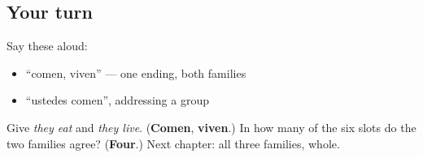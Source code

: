 \subsection*{Your turn}
Say these aloud:

\begin{itemize}
\raggedright
  \item \textquotedblleft{}comen, viven\textquotedblright{} — one ending, both families
  \item \textquotedblleft{}ustedes comen\textquotedblright{}, addressing a group
\end{itemize}

\begin{tcolorbox}[breakable,colback=teal!4,colframe=teal!35!black,title={Before you move on}]
Give \emph{they eat} and \emph{they live}. (\textbf{Comen}, \textbf{viven}.) In how many of the six slots do the two families agree? (\textbf{Four}.) Next chapter: all three families, whole.
\end{tcolorbox}
